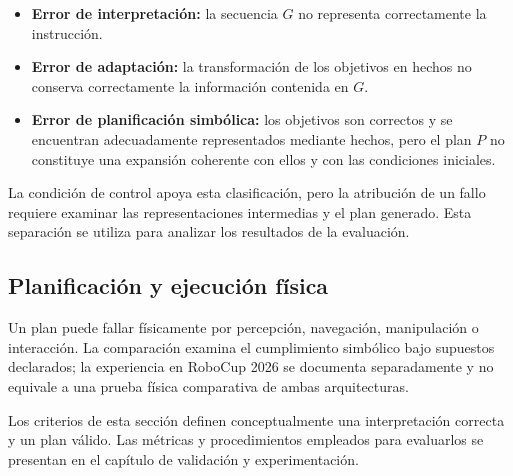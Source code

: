 \begin{itemize}

    \item \textbf{Error de interpretación:} la secuencia $G$ no
    representa correctamente la instrucción.

    \item \textbf{Error de adaptación:} la transformación de los
    objetivos en hechos no conserva correctamente la información
    contenida en $G$.

    \item \textbf{Error de planificación simbólica:} los objetivos
    son correctos y se encuentran adecuadamente representados
    mediante hechos, pero el plan $P$ no constituye una expansión
    coherente con ellos y con las condiciones iniciales.

\end{itemize}

La condición de control apoya esta clasificación, pero la atribución
de un fallo requiere examinar las representaciones intermedias y el
plan generado. Esta separación se utiliza para
analizar los resultados de la evaluación.
\subsection{Planificación y ejecución física}
\label{subsec:planificacion_ejecucion}

Un plan puede fallar físicamente por percepción, navegación, manipulación o interacción. La comparación examina el cumplimiento simbólico bajo supuestos declarados; la experiencia en RoboCup 2026 se documenta separadamente y no equivale a una prueba física comparativa de ambas arquitecturas.



Los criterios de esta sección definen conceptualmente una interpretación
correcta y un plan válido. Las métricas y procedimientos empleados para
evaluarlos se presentan en el capítulo de validación y experimentación.
